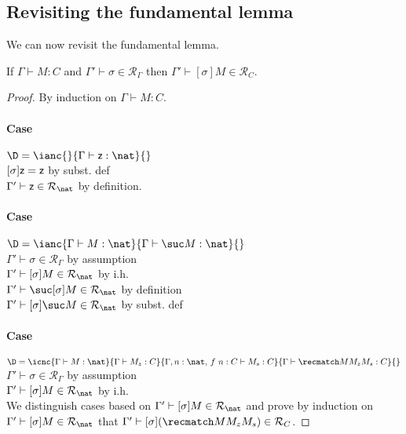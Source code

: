 \documentclass{article}
\newcommand{\denot}[1]{\mathcal{R}_{#1}}
\newcommand{\inden}[3]{#1 \vdash #2 \in \denot{#3}}
\begin{document}
 \subsection{Revisiting the fundamental lemma}

 We can now revisit the fundamental lemma.
 \begin{lemma}
 If $\Gamma \vdash M : C$ and $\inden{\Gamma'}{\sigma}{\Gamma}$
 then $\inden{\Gamma'}{[\sigma]M}{C}$.
 \end{lemma}
 \begin{proof}
 By induction on $\Gamma \vdash M : C$.

 \paragraph{Case} $\D = \ianc{}{\Gamma \vdash \zero : \nat}{}$
 \\
 $[\sigma]\mathsf{z} = \mathsf{z}$ \hfill by subst. def \\
 $\inden{\Gamma'}{\zero}{\nat}$ \hfill by definition.


 \paragraph{Case} $\D = \ianc{\Gamma \vdash M : \nat}{\Gamma \vdash \suc M :  \nat}{}$
 \\
 $\inden{\Gamma'}{\sigma}{\Gamma}$ \hfill by assumption \\
 $\inden{\Gamma'}{[\sigma]M}{\nat}$ \hfill by i.h. \\
 $\inden{\Gamma'}{\suc [\sigma]M}{\nat}$ \hfill by definition \\
 $\inden{\Gamma'}{[\sigma] \suc M}{\nat}$ \hfill by subst. def


 \paragraph{Case} $\D = \icnc
 {\Gamma \vdash M : \nat}
 {\Gamma \vdash M_z : C}
 {\Gamma, n:\nat,\,f~n:C \vdash M_s : C}
 {\Gamma \vdash \recnat M {M_z} {M_s} : C}{}$
 \\
 $\inden{\Gamma'}{\sigma}{\Gamma}$ \hfill by assumption \\
 $\inden{\Gamma'}{[\sigma]M}{\nat}$ \hfill by i.h. \\[1em]
 We distinguish cases based on $\inden{\Gamma'}{[\sigma]M}{\nat}$ and prove by induction on $\inden{\Gamma'}{[\sigma]M}{\nat}$ that $\inden{\Gamma'}{[\sigma](\recnat M {M_z} {M_s})}{C}$.


\end{proof}
\end{document}
